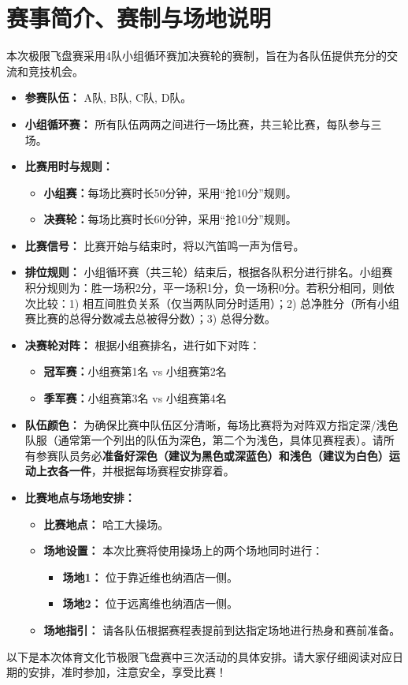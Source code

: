 \documentclass{ctexart}
\begin{document}
\section{赛事简介、赛制与场地说明}
本次极限飞盘赛采用4队小组循环赛加决赛轮的赛制，旨在为各队伍提供充分的交流和竞技机会。
\begin{itemize}
    \item \textbf{参赛队伍：} A队, B队, C队, D队。
    \item \textbf{小组循环赛：} 所有队伍两两之间进行一场比赛，共三轮比赛，每队参与三场。
    \item \textbf{比赛用时与规则：}
        \begin{itemize}
            \item \textbf{小组赛：}每场比赛时长50分钟，采用“抢10分”规则。
            \item \textbf{决赛轮：}每场比赛时长60分钟，采用“抢10分”规则。
        \end{itemize}
    \item \textbf{比赛信号：} 比赛开始与结束时，将以汽笛鸣一声为信号。
    \item \textbf{排位规则：} 小组循环赛（共三轮）结束后，根据各队积分进行排名。小组赛积分规则为：胜一场积2分，平一场积1分，负一场积0分。若积分相同，则依次比较：1) 相互间胜负关系（仅当两队同分时适用）；2) 总净胜分（所有小组赛比赛的总得分数减去总被得分数）；3) 总得分数。
    \item \textbf{决赛轮对阵：} 根据小组赛排名，进行如下对阵：
    \begin{itemize}
        \item \textbf{冠军赛：}小组赛第1名 vs 小组赛第2名
        \item \textbf{季军赛：}小组赛第3名 vs 小组赛第4名
    \end{itemize}
    \item \textbf{队伍颜色：} 为确保比赛中队伍区分清晰，每场比赛将为对阵双方指定深/浅色队服（通常第一个列出的队伍为深色，第二个为浅色，具体见赛程表）。请所有参赛队员务必\textbf{准备好深色（建议为黑色或深蓝色）和浅色（建议为白色）运动上衣各一件}，并根据每场赛程安排穿着。
    \item \textbf{比赛地点与场地安排：}
    \begin{itemize}
        \item \textbf{比赛地点：} 哈工大操场。
        \item \textbf{场地设置：} 本次比赛将使用操场上的两个场地同时进行：
            \begin{itemize}
                \item \textbf{场地1：} 位于靠近维也纳酒店一侧。
                \item \textbf{场地2：} 位于远离维也纳酒店一侧。
            \end{itemize}
        \item \textbf{场地指引：} 请各队伍根据赛程表提前到达指定场地进行热身和赛前准备。
    \end{itemize}
\end{itemize}
\vspace{1em}
以下是本次体育文化节极限飞盘赛中三次活动的具体安排。请大家仔细阅读对应日期的安排，准时参加，注意安全，享受比赛！
\end{document}
